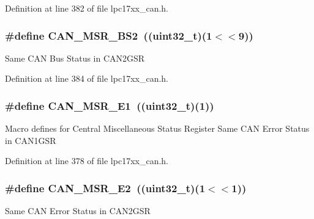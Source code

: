 \-Definition at line 382 of file lpc17xx\-\_\-can.\-h.

\hypertarget{group___c_a_n___private___macros_gae037dc358b9d57bcae58904a46a5c32f}{
\subsubsection[{\-C\-A\-N\-\_\-\-M\-S\-R\-\_\-\-B\-S2}]{\setlength{\rightskip}{0pt plus 5cm}\#define {\bf \-C\-A\-N\-\_\-\-M\-S\-R\-\_\-\-B\-S2}~((uint32\-\_\-t)(1$<$$<$9))}}\label{group___c_a_n___private___macros_gae037dc358b9d57bcae58904a46a5c32f}
\-Same \-C\-A\-N \-Bus \-Status in \-C\-A\-N2\-G\-S\-R 

\-Definition at line 384 of file lpc17xx\-\_\-can.\-h.

\hypertarget{group___c_a_n___private___macros_ga5ca2749c14cc8c75f6ee05268c111295}{
\subsubsection[{\-C\-A\-N\-\_\-\-M\-S\-R\-\_\-\-E1}]{\setlength{\rightskip}{0pt plus 5cm}\#define {\bf \-C\-A\-N\-\_\-\-M\-S\-R\-\_\-\-E1}~((uint32\-\_\-t)(1))}}\label{group___c_a_n___private___macros_ga5ca2749c14cc8c75f6ee05268c111295}
\-Macro defines for \-Central \-Miscellaneous \-Status \-Register \-Same \-C\-A\-N \-Error \-Status in \-C\-A\-N1\-G\-S\-R 

\-Definition at line 378 of file lpc17xx\-\_\-can.\-h.

\hypertarget{group___c_a_n___private___macros_ga7edc55854d6ac26635a8580a8bc907c1}{
\subsubsection[{\-C\-A\-N\-\_\-\-M\-S\-R\-\_\-\-E2}]{\setlength{\rightskip}{0pt plus 5cm}\#define {\bf \-C\-A\-N\-\_\-\-M\-S\-R\-\_\-\-E2}~((uint32\-\_\-t)(1$<$$<$1))}}\label{group___c_a_n___private___macros_ga7edc55854d6ac26635a8580a8bc907c1}
\-Same \-C\-A\-N \-Error \-Status in \-C\-A\-N2\-G\-S\-R 

